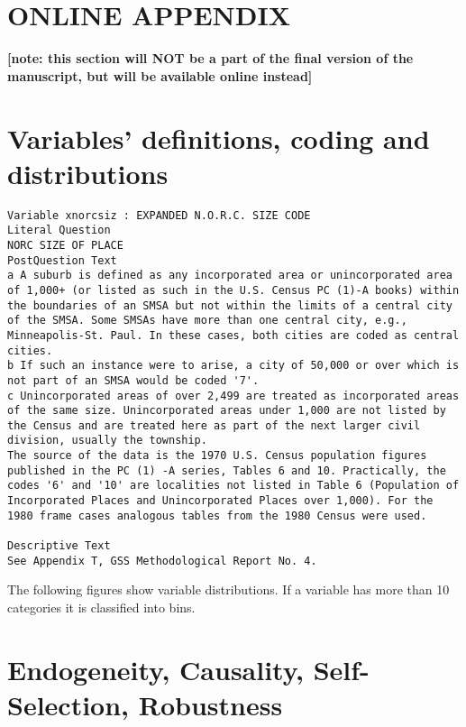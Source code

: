 \documentclass[10pt, letterpaper]{article}
\begin{document}
\begin{spacing}{2.0}
\section*{\Huge ONLINE APPENDIX}
\textbf{[note: this section will NOT be a part of the final version of
  the manuscript, but will be available online instead]} %
\section*{Variables' definitions, coding and distributions}
\label{app_var_des}

{\scriptsize
\begin{verbatim}
Variable xnorcsiz : EXPANDED N.O.R.C. SIZE CODE
Literal Question
NORC SIZE OF PLACE
PostQuestion Text
a A suburb is defined as any incorporated area or unincorporated area
of 1,000+ (or listed as such in the U.S. Census PC (1)-A books) within
the boundaries of an SMSA but not within the limits of a central city
of the SMSA. Some SMSAs have more than one central city, e.g.,
Minneapolis-St. Paul. In these cases, both cities are coded as central
cities.
b If such an instance were to arise, a city of 50,000 or over which is
not part of an SMSA would be coded '7'.
c Unincorporated areas of over 2,499 are treated as incorporated areas
of the same size. Unincorporated areas under 1,000 are not listed by
the Census and are treated here as part of the next larger civil
division, usually the township.
The source of the data is the 1970 U.S. Census population figures
published in the PC (1) -A series, Tables 6 and 10. Practically, the
codes '6' and '10' are localities not listed in Table 6 (Population of
Incorporated Places and Unincorporated Places over 1,000). For the
1980 frame cases analogous tables from the 1980 Census were used.

Descriptive Text
See Appendix T, GSS Methodological Report No. 4.
\end{verbatim}
}

The following figures show variable distributions. If a variable has more than
10 categories it is classified into bins.




\section*{Endogeneity, Causality, Self-Selection, Robustness}


\end{spacing}
\end{document}
